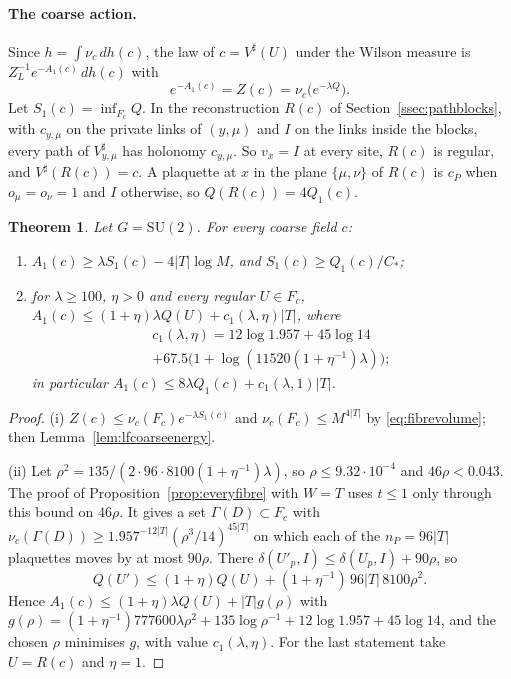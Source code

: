 \documentclass[11pt]{amsart}
\newtheorem{theorem}{Theorem}[section]
\theoremstyle{definition}
\theoremstyle{remark}
\numberwithin{equation}{section}
\newcommand{\SU}{\mathrm{SU}}
\begin{document}
\paragraph*{The coarse action.}
Since $h=\int\nu_c\,dh(c)$, the law of $c=V^\sharp(U)$ under the Wilson
measure is $Z_L^{-1}e^{-A_1(c)}\,dh(c)$ with
\[
e^{-A_1(c)}=Z(c)=\nu_c\bigl(e^{-\lambda Q}\bigr).
\]
Let $S_1(c)=\inf_{F_c}Q$. In the reconstruction $R(c)$ of
Section~\ref{ssec:pathblocks}, with $c_{y,\mu}$ on the private links of
$(y,\mu)$ and $I$ on the links inside the blocks, every path of $V^\sharp_
{y,\mu}$ has holonomy $c_{y,\mu}$. So $v_x=I$ at every site, $R(c)$ is
regular, and $V^\sharp(R(c))=c$. A plaquette at $x$ in the plane
$\{\mu,\nu\}$ of $R(c)$ is $c_P$ when $o_\mu=o_\nu=1$ and $I$ otherwise,
so $Q(R(c))=4Q_1(c)$.

\begin{theorem}\label{thm:lfaction}
Let $G=\SU(2)$. For every coarse field $c$:
\begin{enumerate}[label=\textup{(\roman*)},leftmargin=*]
\item $A_1(c)\ge\lambda S_1(c)-4|T|\log M$, and $S_1(c)\ge Q_1(c)/C_*$;
\item for $\lambda\ge100$, $\eta>0$ and every regular $U\in F_c$,
$A_1(c)\le(1+\eta)\lambda Q(U)+c_1(\lambda,\eta)|T|$, where
\begin{multline*}
c_1(\lambda,\eta)=12\log1.957+45\log14\\
+67.5\bigl(1+\log(11520(1+\eta^{-1})\lambda)\bigr);
\end{multline*}
in particular $A_1(c)\le8\lambda Q_1(c)+c_1(\lambda,1)|T|$.
\end{enumerate}
\end{theorem}

\begin{proof}
(i) $Z(c)\le\nu_c(F_c)e^{-\lambda S_1(c)}$ and $\nu_c(F_c)\le M^{4|T|}$ by
\eqref{eq:fibrevolume}; then Lemma~\ref{lem:lfcoarseenergy}.

(ii) Let $\rho^2=135/(2\cdot96\cdot8100(1+\eta^{-1})\lambda)$, so $\rho\le
9.32\cdot10^{-4}$ and $46\rho<0.043$. The proof of
Proposition~\ref{prop:everyfibre} with $W=T$ uses $t\le1$ only through this
bound on $46\rho$. It gives a set $\Gamma(D)\subset F_c$ with $\nu_c(\Gamma(D))
\ge1.957^{-12|T|}(\rho^3/14)^{45|T|}$ on which each of the $n_P=96|T|$
plaquettes moves by at most $90\rho$. There $\delta(U'_p,I)\le\delta(U_p,
I)+90\rho$, so
\[
Q(U')\le(1+\eta)Q(U)+(1+\eta^{-1})\,96|T|\,8100\rho^2 .
\]
Hence $A_1(c)\le(1+\eta)\lambda Q(U)+|T|g(\rho)$ with $g(\rho)=(1+
\eta^{-1})777600\lambda\rho^2+135\log\rho^{-1}+12\log1.957+45\log14$, and
the chosen $\rho$ minimises $g$, with value $c_1(\lambda,\eta)$. For the
last statement take $U=R(c)$ and $\eta=1$.
\end{proof}
\end{document}
